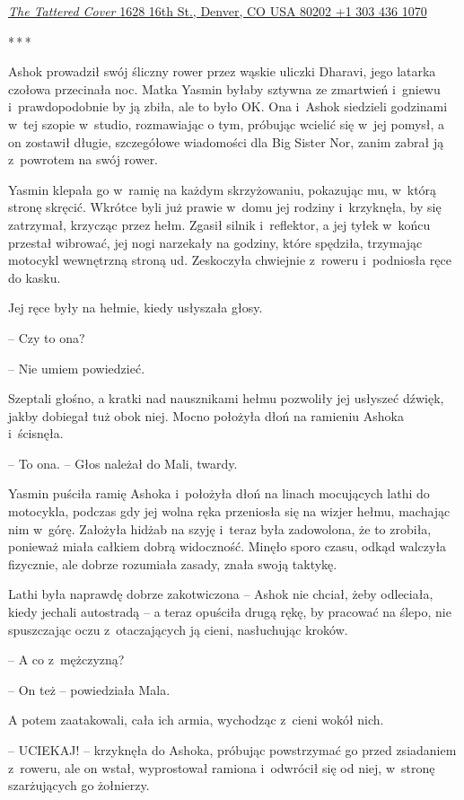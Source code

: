 \documentclass[oneside,polish,11pt,rmheadings]{mwbk}
\newcommand{\threeast}{\par\centerline{*\,*\,*}\medskip\par}
\begin{document}
\href{https://www.tatteredcover.com/search/author/%22Doctorow%2C%20Cory%22}{\textit{The Tattered Cover} 1628 16th St., Denver, CO USA 80202 +1 303 436 1070} 

\bigskip
\threeast


Ashok prowadził swój śliczny rower przez wąskie uliczki Dharavi, jego latarka czołowa przecinała noc. Matka Yasmin byłaby sztywna ze zmartwień i~gniewu i~prawdopodobnie by ją zbiła, ale to było OK. Ona i~Ashok siedzieli godzinami w~tej szopie w~studio, rozmawiając o tym, próbując wcielić się w~jej pomysł, a on zostawił długie, szczegółowe wiadomości dla Big Sister Nor, zanim zabrał ją z~powrotem na swój rower.

Yasmin klepała go w~ramię na każdym skrzyżowaniu, pokazując mu, w~którą stronę skręcić. Wkrótce byli już prawie w~domu jej rodziny i~krzyknęła, by się zatrzymał, krzycząc przez hełm. Zgasił silnik i~reflektor, a jej tyłek w~końcu przestał wibrować, jej nogi narzekały na godziny, które spędziła, trzymając motocykl wewnętrzną stroną ud. Zeskoczyła chwiejnie z~roweru i~podniosła ręce do kasku.

Jej ręce były na hełmie, kiedy usłyszała głosy.

-- Czy to ona?

-- Nie umiem powiedzieć.

Szeptali głośno, a kratki nad nausznikami hełmu pozwoliły jej usłyszeć dźwięk, jakby dobiegał tuż obok niej. Mocno położyła dłoń na ramieniu Ashoka i~ścisnęła.

-- To ona. -- Głos należał do Mali, twardy.

Yasmin puściła ramię Ashoka i~położyła dłoń na linach mocujących lathi do motocykla, podczas gdy jej wolna ręka przeniosła się na wizjer hełmu, machając nim w~górę. Założyła hidżab na szyję i~teraz była zadowolona, że to zrobiła, ponieważ miała całkiem dobrą widoczność. Minęło sporo czasu, odkąd walczyła fizycznie, ale dobrze rozumiała zasady, znała swoją taktykę.

Lathi była naprawdę dobrze zakotwiczona -- Ashok nie chciał, żeby odleciała, kiedy jechali autostradą -- a teraz opuściła drugą rękę, by pracować na ślepo, nie spuszczając oczu z~otaczających ją cieni, nasłuchując kroków.

-- A co z~mężczyzną?

-- On też -- powiedziała Mala.

A potem zaatakowali, cała ich armia, wychodząc z~cieni wokół nich. 

-- UCIEKAJ! -- krzyknęła do Ashoka, próbując powstrzymać go przed zsiadaniem z~roweru, ale on wstał, wyprostował ramiona i~odwrócił się od niej, w~stronę szarżujących go żołnierzy. 
\end{document}
